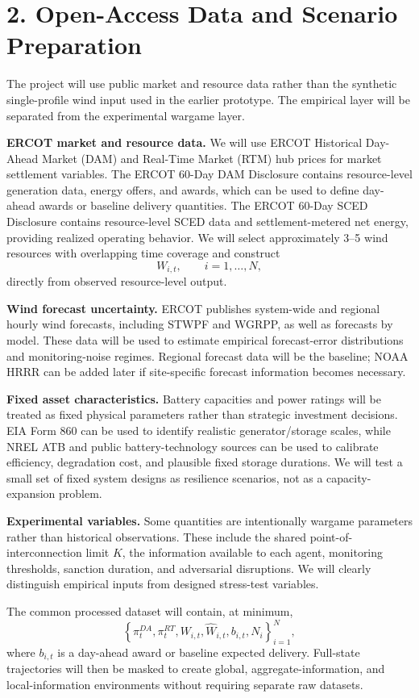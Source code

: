 \documentclass[10pt]{article}
\begin{document}
\section*{2. Open-Access Data and Scenario Preparation}

The project will use public market and resource data rather than the synthetic single-profile wind input used in the earlier prototype. The empirical layer will be separated from the experimental wargame layer.

\textbf{ERCOT market and resource data.}
We will use ERCOT Historical Day-Ahead Market (DAM) and Real-Time Market (RTM) hub prices for market settlement variables. The ERCOT 60-Day DAM Disclosure contains resource-level generation data, energy offers, and awards, which can be used to define day-ahead awards or baseline delivery quantities. The ERCOT 60-Day SCED Disclosure contains resource-level SCED data and settlement-metered net energy, providing realized operating behavior. We will select approximately 3--5 wind resources with overlapping time coverage and construct
\[
W_{i,t}, \qquad i=1,\ldots,N,
\]
directly from observed resource-level output.

\textbf{Wind forecast uncertainty.}
ERCOT publishes system-wide and regional hourly wind forecasts, including STWPF and WGRPP, as well as forecasts by model. These data will be used to estimate empirical forecast-error distributions and monitoring-noise regimes. Regional forecast data will be the baseline; NOAA HRRR can be added later if site-specific forecast information becomes necessary.

\textbf{Fixed asset characteristics.}
Battery capacities and power ratings will be treated as fixed physical parameters rather than strategic investment decisions. EIA Form 860 can be used to identify realistic generator/storage scales, while NREL ATB and public battery-technology sources can be used to calibrate efficiency, degradation cost, and plausible fixed storage durations. We will test a small set of fixed system designs as resilience scenarios, not as a capacity-expansion problem.

\textbf{Experimental variables.}
Some quantities are intentionally wargame parameters rather than historical observations. These include the shared point-of-interconnection limit $K$, the information available to each agent, monitoring thresholds, sanction duration, and adversarial disruptions. We will clearly distinguish empirical inputs from designed stress-test variables.

The common processed dataset will contain, at minimum,
\[
\left\{
\pi_t^{DA},
\pi_t^{RT},
W_{i,t},
\widehat W_{i,t},
b_{i,t},
N_i
\right\}_{i=1}^{N},
\]
where $b_{i,t}$ is a day-ahead award or baseline expected delivery. Full-state trajectories will then be masked to create global, aggregate-information, and local-information environments without requiring separate raw datasets.
\end{document}
